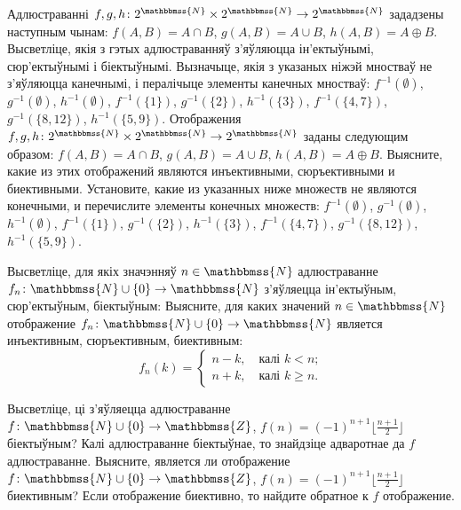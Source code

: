 \begin{problemList}
\problemItemSimple
{Адлюстраванні $f, g, h \colon 2^{\mathbbmss{N}} \times 2^{\mathbbmss{N}} \to 2^{\mathbbmss{N}}$ зададзены наступным чынам: $f(A, B) = A \cap B$,
$g(A, B) = A \cup B$, $h(A, B) = A \oplus B$. Высветліце, якія з гэтых адлюстраванняў з'яўляюцца ін'ектыўнымі, сюр'ектыўнымі і біектыўнымі. Вызначыце, якія з указаных ніжэй мностваў не з'яўляюцца канечнымі, і пералічыце элементы канечных мностваў: $f^{-1}(\emptyset)$,
$g^{-1}(\emptyset)$, $h^{-1}(\emptyset)$, $f^{-1}(\{1\})$,
$g^{-1}(\{2\})$, $h^{-1}(\{3\})$, $f^{-1}(\{4, 7\})$,
$g^{-1}(\{8, 12\})$, $h^{-1}(\{5, 9\})$.}
{Отображения $f, g, h \colon 2^{\mathbbmss{N}} \times 2^{\mathbbmss{N}} \to 2^{\mathbbmss{N}}$ заданы следующим образом: $f(A, B) = A \cap B$, $g(A, B) = A \cup B$, $h(A, B) = A \oplus B$. Выясните, какие из этих отображений являются инъективными, сюръективными и биективными. Установите, какие из указанных ниже множеств не являются конечными, и перечислите элементы конечных множеств: $f^{-1}(\emptyset)$, 
$g^{-1}(\emptyset)$, $h^{-1}(\emptyset)$, $f^{-1}(\{1\})$, 
$g^{-1}(\{2\})$, $h^{-1}(\{3\})$, $f^{-1}(\{4, 7\})$,  
$g^{-1}(\{8, 12\})$, $h^{-1}(\{5, 9\})$.}

\bigskip

\problemItemWithCommonPart
{Высветліце, для якіх значэнняў $n \in \mathbbmss{N}$ адлюстраванне $f_n \colon \mathbbmss{N} \cup \{0\} \to \mathbbmss{N}$ з'яўляецца ін'ектыўным, сюр'ектыўным, біектыўным:}
{Выясните, для каких значений $n \in \mathbbmss{N}$ отображение $f_n \colon \mathbbmss{N} \cup \{0\} \to \mathbbmss{N}$ является инъективным, сюръективным, биективным:}
{%
\begin{equation*}
f_n(k) =
\begin{cases}
n - k, \quad \text{калі $k < n$;} \\
n + k, \quad \text{калі $k \ge n$.}
\end{cases}
\end{equation*}
}

\bigskip

\problemItemSimple
{Высветліце, ці з'яўляецца адлюстраванне $f \colon \mathbbmss{N} \cup \{0\} \to \mathbbmss{Z}$, $f(n) = (-1)^{n + 1}\bigl\lfloor\frac{n + 1}{2}\bigr\rfloor$ біектыўным? Калі адлюстраванне біектыўнае, то знайдзіце адваротнае да $f$ адлюстраванне.}
{Выясните, является ли отображение $f \colon \mathbbmss{N} \cup \{0\} \to \mathbbmss{Z}$, $f(n) = (-1)^{n + 1}\bigl\lfloor\frac{n + 1}{2}\bigr\rfloor$ биективным? Если отображение биективно, то найдите обратное к $f$ отображение.}

\bigskip


\end{problemList}
